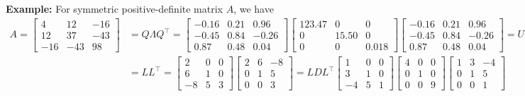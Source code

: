 \documentclass[14pt]{article}
\theoremstyle{definition}
\theoremstyle{remark}
\begin{document}
\textbf{Example:} For symmetric positive-definite matrix $A$, we have
\begin{align*}
    A = \begin{bmatrix}
            4   & 12  & -16 \\
            12  & 37  & -43 \\
            -16 & -43 & 98
        \end{bmatrix} & = Q\Lambda Q^\top =\begin{bmatrix}
                                               -0.16 & 0.21 & 0.96  \\
                                               -0.45 & 0.84 & -0.26 \\
                                               0.87  & 0.48 & 0.04
                                           \end{bmatrix}
    \begin{bmatrix}
        123.47 & 0     & 0     \\
        0      & 15.50 & 0     \\
        0      & 0     & 0.018
    \end{bmatrix}
    \begin{bmatrix}
        -0.16 & 0.21 & 0.96  \\
        -0.45 & 0.84 & -0.26 \\
        0.87  & 0.48 & 0.04
    \end{bmatrix} = U\Sigma V^\top                              \\
                        & =LL^\top =  \begin{bmatrix}
                                          2  & 0 & 0 \\
                                          6  & 1 & 0 \\
                                          -8 & 5 & 3
                                      \end{bmatrix}
    \begin{bmatrix}
        2 & 6 & -8 \\
        0 & 1 & 5  \\
        0 & 0 & 3
    \end{bmatrix}=LDL^\top \begin{bmatrix}
                               1  & 0 & 0 \\
                               3  & 1 & 0 \\
                               -4 & 5 & 1
                           \end{bmatrix}
    \begin{bmatrix}
        4 & 0 & 0 \\
        0 & 1 & 0 \\
        0 & 0 & 9
    \end{bmatrix}
    \begin{bmatrix}
        1 & 3 & -4 \\
        0 & 1 & 5  \\
        0 & 0 & 1
    \end{bmatrix}
\end{align*}
\end{document}
